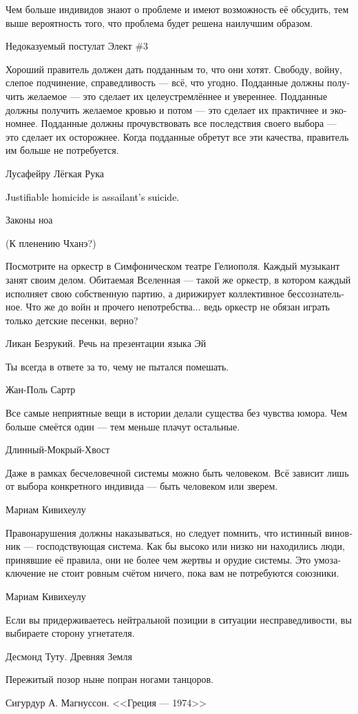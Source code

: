 \documentclass[a4paper,12pt,fleqn]{book}\usepackage{cooltooltips}\usepackage{polyglossia}\setdefaultlanguage[babelshorthands=true]{russian}\setotherlanguage{english}\defaultfontfeatures{Ligatures=TeX,Mapping=tex-text} \usepackage{xcolor}\definecolor{lightgray}{HTML}{bbbbbb}\color{lightgray}\newcommand{\ml}[3]{\textenglish{\textcolor{black}{#3}}}
\begin{document}
{\epigraph
{Чем больше индивидов знают о проблеме и имеют возможность её обсудить, тем выше вероятность того, что проблема будет решена наилучшим образом.}
{Недоказуемый постулат Элект \#3}

\epigraph
{Хороший правитель должен дать подданным то, что они хотят.
Свободу, войну, слепое подчинение, справедливость --- всё, что угодно.
Подданные должны получить желаемое --- это сделает их целеустремлённее и увереннее.
Подданные должны получить желаемое кровью и потом --- это сделает их практичнее и экономнее.
Подданные должны прочувствовать все последствия своего выбора --- это сделает их осторожнее.
Когда подданные обретут все эти качества, правитель им больше не потребуется.}
{Лусафейру Лёгкая Рука}

\epigraph{
\ml{$0$}
{Убийство в целях самозащиты является самоубийством нападающего.}
{Justifiable homicide is assailant's suicide.}
}{Законы ноа}

(К пленению Чханэ?)

\epigraph
{Посмотрите на оркестр в Симфоническом театре Гелиополя.
Каждый музыкант занят своим делом.
Обитаемая Вселенная --- такой же оркестр, в котором каждый исполняет свою собственную партию, а дирижирует коллективное бессознательное.
Что же до войн и прочего непотребства... ведь оркестр не обязан играть только детские песенки, верно?}
{Ликан Безрукий.
Речь на презентации языка Эй}

\epigraph
{Ты всегда в ответе за то, чему не пытался помешать.}
{Жан-Поль Сартр}

\epigraph
{Все самые неприятные вещи в истории делали существа без чувства юмора.
Чем больше смеётся один --- тем меньше плачут остальные.}
{Длинный-Мокрый-Хвост}

\epigraph
{Даже в рамках бесчеловечной системы можно быть человеком.
Всё зависит лишь от выбора конкретного индивида --- быть человеком или зверем.}
{Мариам Кивихеулу}

\epigraph
{Правонарушения должны наказываться, но следует помнить, что истинный виновник --- господствующая система.
Как бы высоко или низко ни находились люди, принявшие её правила, они не более чем жертвы и орудие системы.
Это умозаключение не стоит ровным счётом ничего, пока вам не потребуются союзники.}
{Мариам Кивихеулу}

\epigraph
{Если вы придерживаетесь нейтральной позиции в ситуации несправедливости, вы выбираете сторону угнетателя.}
{Десмонд Туту. Древняя Земля}

\epigraph
{Пережитый позор ныне попран ногами танцоров.}
{Сигурдур А. Магнуссон. <<Греция --- 1974>>}

}
\end{document}
